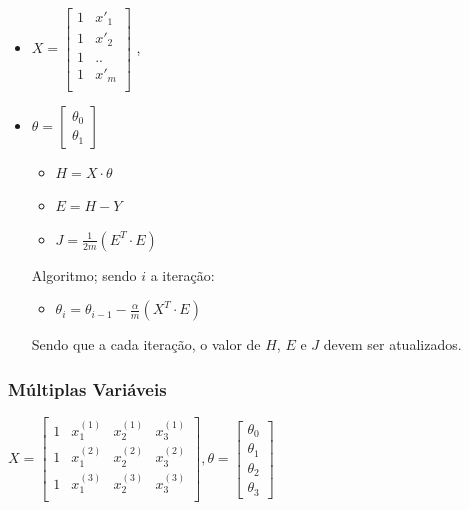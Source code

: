 \documentclass[12pt]{article}
\providecommand{\tightlist}{%
\setlength{\itemsep}{0pt}\setlength{\parskip}{0pt}}
\begin{document}
\begin{itemize}
\tightlist
\item
  \(X=\begin{bmatrix}  1 & x'_1 \\  1 & x'_2 \\  1 & .. \\  1 & x'_m \\  \end{bmatrix}\)
  ,
\item
  \(\theta=\begin{bmatrix}  \theta_0\\  \theta_1  \end{bmatrix}\)

  \begin{itemize}
  \tightlist
  \item
    \(H=X \cdot \theta\)
  \item
    \(E=H - Y\)
  \item
    \(J=\frac{1}{2m}(E^T \cdot E)\)
  \end{itemize}

  Algoritmo; sendo \(i\) a iteração:

  \begin{itemize}
  \tightlist
  \item
    \(\theta_i=\theta_{i-1} - \frac{\alpha}{m}(X^T \cdot E)\)
  \end{itemize}

  Sendo que a cada iteração, o valor de \(H\), \(E\) e \(J\) devem ser
  atualizados.
\end{itemize}

\hypertarget{muxfaltiplas-variuxe1veis}{%
\subsubsection{Múltiplas Variáveis}\label{muxfaltiplas-variuxe1veis}}

\(X=\begin{bmatrix} 1 & x^{(1)}_1 & x^{(1)}_2 & x^{(1)}_3 \\ 1 & x^{(2)}_1 & x^{(2)}_2 & x^{(2)}_3 \\ 1 & x^{(3)}_1 & x^{(3)}_2 & x^{(3)}_3 \\ \end{bmatrix}, \theta=\begin{bmatrix} \theta_0 \\ \theta_1 \\ \theta_2 \\ \theta_3 \end{bmatrix}\)
\end{document}
